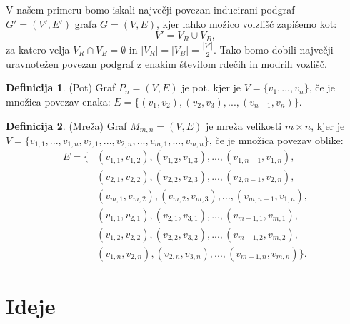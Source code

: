 \documentclass[a4paper, 11pt]{article}
\theoremstyle{definition}
\newtheorem{definicija}{Definicija}
\theoremstyle{definition}
\begin{document}
    V našem primeru bomo iskali največji povezan inducirani podgraf \\ $G' = (V', E')$ grafa $G = (V, E)$, kjer lahko možico volzlišč
    zapišemo kot: 
        $$ V' = V_{R} \cup V_{B},$$
    za katero velja $ V_{R} \cap  V_{B} = \emptyset $ in $|V_{R}| = |V_{B}| = \frac{|V'|}{2}$. Tako bomo dobili
    največji uravnotežen povezan podgraf z enakim številom rdečih in modrih vozlišč.    

    \begin{definicija} (Pot) Graf $P_n=(V,E)$ je pot, kjer je
        $V=\{ v_1,...,v_n \}$, če je množica povezav enaka:
        $E = \{ (v_1,v_2),(v_2,v_3),...,(v_{n-1},v_n) \}$.
    \end{definicija}

    \begin{definicija} 
    (Mreža) Graf $M_{m,n}=(V,E)$ je mreža velikosti $m \times n$, 
    kjer je $V=\{ v_{1,1},...,v_{1,n},v_{2,1},...,v_{2,n},...,v_{m,1},...,v_{m,n} \}$, če je množica povezav oblike:
    \begin{align*}
    E =\{ &(v_{1,1}, v_{1,2}),(v_{1,2},v_{1,3}),...,(v_{1,n-1},v_{1,n}),  \\
        &(v_{2,1}, v_{2,2}),(v_{2,2},v_{2,3}),...,(v_{2,n-1},v_{2,n}),  \\
        &(v_{m,1}, v_{m,2}),(v_{m,2},v_{m,3}),...,(v_{m,n-1},v_{1,n}), \\
        &(v_{1,1}, v_{2,1}),(v_{2,1},v_{3,1}),...,(v_{m-1,1},v_{m,1}),  \\
        &(v_{1,2}, v_{2,2}),(v_{2,2},v_{3,2}),...,(v_{m-1,2},v_{m,2}), \\
        &(v_{1,n}, v_{2,n}),(v_{2,n},v_{3,n}),...,(v_{m-1,n},v_{m,n})  \}.  
    \end{align*}
    \end{definicija}

    \section{Ideje}
\end{document}
